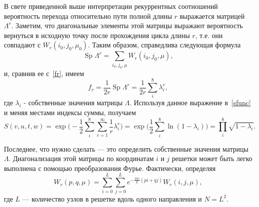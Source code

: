 \documentclass[utf8,12pt]{jetp}
\DeclareMathOperator{\spur}{Sp}
\begin{document}
В свете приведенной выше интерпретации рекуррентных соотношений вероятность перехода относительно пути полной длины $r$ выражается матрицей $\Lambda^r$. Заметим, что диагональные элементы этой матрицы выражают вероятность вернуться в исходную точку после прохождения цикла длины $r$, т.е. они совпадают с $W_r(i_0, j_0, \mu_0)$.
Таким образом, справедлива следующая формула
\begin{equation}
\spur \Lambda^r = \sum_{i_0, j_0, \mu} W_r(i_0, j_0, \mu),
\end{equation}
и, сравнив ее с~\eqref{fr}, имеем
\begin{equation}
	f_r = \frac{1}{2r}\spur \Lambda^r = \frac{1}{2r} \sum_{i}^{8} \lambda_{i}^{r},
\end{equation}
где $\lambda_i$ - собственные значения матрицы $\Lambda$. Используя данное выражение в~\eqref{sfunc} и меняя местами индексы суммы, получаем
\begin{equation}
	S(v, u, t, w) = \exp \bigg(-\frac{1}{2} \sum_{i}^{8} \sum_{r = 1}^{\infty} \frac{1}{r} \lambda^r_i \bigg) = \exp \bigg(\frac{1}{2} \sum_{i}^{8} \ln (1 - \lambda_i) \bigg) = \prod_{i}^{8} \sqrt{1 - \lambda_i}.
	\label{slast}
\end{equation}

Последнее, что нужно сделать --- это определить собственные значения матрицы $\Lambda$. Диагонализация этой матрицы по координатам $i$ и $j$ решетки может быть легко выполнена с помощью преобразования Фурье. Фактически, определяя
\begin{equation}
	W_r (p, q, \mu) = \sum_{i = 0}^{L} \sum_{j = 0}^{L} e^{-\frac{2\pi i}{L}(pi + qj)} W_r (i, j, \mu),
\end{equation}
где $L$ --- количество узлов в решетке вдоль одного направления  и $N = L^2$. 
\end{document}
